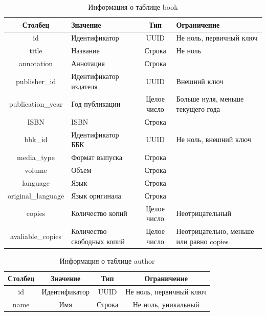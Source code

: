 \begin{table}[H]
    \begin{center}
        \caption{Информация о таблице book}
        \begin{tabular}{|c|p{4cm}|c|p{4cm}|}
            \hline
            \textbf{Столбец} & \textbf{Значение} & \textbf{Тип} & \textbf{Ограничение} \\
            \hline
            id & Идентификатор & UUID & Не ноль, первичный ключ \\
            \hline
            title & Название & Строка & Не ноль \\
            \hline
            annotation & Аннотация & Строка &  \\
            \hline
            publisher\_id & Идентификатор издателя & UUID & Внешний ключ \\
            \hline
            publication\_year & Год публикации & Целое число & Больше нуля, меньше текущего года \\
            \hline
            ISBN & ISBN & Строка &  \\
            \hline
            bbk\_id & Идентификатор ББК & UUID & Не ноль, внешний ключ \\
            \hline
            media\_type & Формат выпуска & Строка &  \\
            \hline
            volume & Объем & Строка &  \\
            \hline
            language & Язык & Строка &  \\
            \hline
            original\_language & Язык оригинала & Строка &  \\
            \hline
            copies & Количество копий & Целое число & Неотрицательный \\
            \hline
            avaliable\_copies & Количество свободных копий & Целое число & Неотрицательно, меньше или равно copies \\
            \hline
        \end{tabular}
    \end{center}
\end{table}

\begin{table}[H]
    \begin{center}
        \caption{Информация о таблице author}
        \begin{tabular}{|c|c|c|c|}
            \hline
            \textbf{Столбец} & \textbf{Значение} & \textbf{Тип} & \textbf{Ограничение} \\
            \hline
            id & Идентификатор & UUID & Не ноль, первичный ключ \\
            \hline
            name & Имя & Строка & Не ноль, уникальный \\
            \hline
        \end{tabular}
    \end{center}
\end{table}

